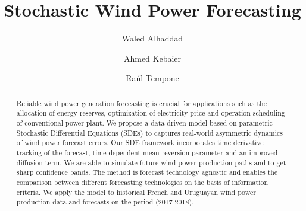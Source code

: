 \documentclass[11pt,english]{article}
\begin{document}
\title{ Stochastic Wind Power Forecasting }  %

\author[1]{Waled Alhaddad}
\author[2]{Ahmed Kebaier}
\author[3]{ Ra\'ul  Tempone}


\maketitle


\begin{abstract}

Reliable wind power generation forecasting is crucial for applications such as the allocation of energy reserves, optimization of electricity price and operation scheduling of conventional power plant. We propose a data driven model based on parametric Stochastic Differential Equations (SDEs) to captures real-world asymmetric dynamics of wind power forecast errors. Our SDE framework incorporates time derivative tracking of the forecast, time-dependent mean reversion parameter and an improved diffusion term. We are able to simulate future wind power production paths and to get sharp confidence bands. The method is forecast technology agnostic and enables the comparison between different forecasting technologies on the basis of information criteria. We apply the model to historical French and Uruguayan wind power production data and forecasts on the period (2017-2018).

\end{abstract}
\end{document}
